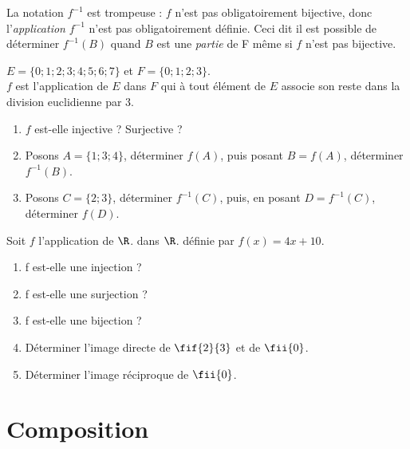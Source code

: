 \documentclass[a4paper,12pt,french]{book}
\begin{document}
\begin{remarque}[]
La notation $f^{-1}$ est trompeuse : $f$ n'est pas obligatoirement bijective, donc l'\textit{application} $f^{-1}$ n'est pas obligatoirement définie. Ceci dit il est possible de déterminer $f^{-1}(B)$ quand $B$ est une \textit{partie} de F même si $f$ n'est pas bijective.
\end{remarque}

\begin{exercice}[]
$E=\{0;1;2;3;4;5;6;7\}$ et $F=\{0;1;2;3\}$.\\
$f$ est l'application de $E$ dans $F$ qui à tout élément de $E$ associe son reste dans la division euclidienne par 3.
\begin{enumerate}[\bfseries 1.]
	\item 	$f$ est-elle injective ? Surjective ?
	\item 	Posons $A=\{1;3;4\}$, déterminer $f(A)$, puis posant $B=f(A)$, déterminer $f^{-1}(B)$.
	\item 	Posons $C=\{2;3\}$, déterminer $f^{-1}(C)$, puis, en posant $D=f^{-1}(C)$, déterminer $f(D)$.\\
\end{enumerate}

\end{exercice}


\begin{exercice}[]
Soit $f$ l'application de $\R$. dans $\R$. définie par $f(x) = 4x + 10$.
\begin{enumerate}[\bfseries 1.]
	\item 	f est-elle une injection ?
	\item 	f est-elle une surjection ?
	\item 	f est-elle une bijection ?
	\item 	Déterminer l'image directe de $\fif{2}{3}$ et de $\fii{0}$.
	\item 	Déterminer l'image réciproque de $\fii{0}$.\\
\end{enumerate}

\end{exercice}


\section{Composition}
\end{document}
